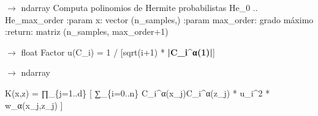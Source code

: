 \documentclass[letterpaper,10pt,english]{sphinxmanual}
\begin{document}

\begin{fulllineitems}
\label{\detokenize{Kernels:Kernels.custom.compute_he}}
\pysigstartsignatures
\pysiglinewithargsret
{}
{\sphinxparamcomma {}}
{{ $\rightarrow$ ndarray}}
\pysigstopsignatures
\sphinxAtStartPar
Computa polinomios de Hermite probabilistas He\_0 .. He\_max\_order
:param x: vector (n\_samples,)
:param max\_order: grado máximo
:return: matriz (n\_samples, max\_order+1)

\end{fulllineitems}


\begin{fulllineitems}
\label{\detokenize{Kernels:Kernels.custom.compute_u}}
\pysigstartsignatures
\pysiglinewithargsret
{}
{\sphinxparamcomma {}}
{{ $\rightarrow$ float}}
\pysigstopsignatures
\sphinxAtStartPar
Factor u(C\_i) = 1 / {[}sqrt(i+1) * {\color{red}\bfseries{}|C\_i\textasciicircum{}α(1)|}{]}

\end{fulllineitems}


\begin{fulllineitems}
\label{\detokenize{Kernels:Kernels.custom.gegenbauer_kernel}}
\pysigstartsignatures
\pysiglinewithargsret
{}
{\sphinxparamcomma {}\sphinxparamcomma {}\sphinxparamcomma {}}
{{ $\rightarrow$ ndarray}}
\pysigstopsignatures\begin{description}
\sphinxAtStartPar
K(x,z) = ∏\_\{j=1..d\} {[} ∑\_\{i=0..n\} C\_i\textasciicircum{}α(x\_j)C\_i\textasciicircum{}α(z\_j) * u\_i\textasciicircum{}2 * w\_α(x\_j,z\_j) {]}

\end{description}

\end{fulllineitems}
\end{document}
